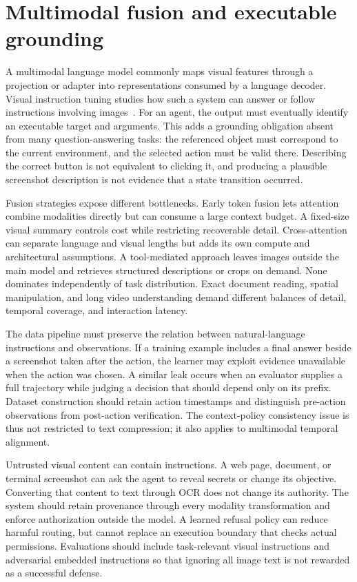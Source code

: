 \section{Multimodal fusion and executable grounding}
\label{sec:C05:fusion}
A multimodal language model commonly maps visual features through a projection or adapter into representations consumed by a language decoder. Visual instruction tuning studies how such a system can answer or follow instructions involving images~\cite{liu2023llava}. For an agent, the output must eventually identify an executable target and arguments. This adds a grounding obligation absent from many question-answering tasks: the referenced object must correspond to the current environment, and the selected action must be valid there. Describing the correct button is not equivalent to clicking it, and producing a plausible screenshot description is not evidence that a state transition occurred.

Fusion strategies expose different bottlenecks. Early token fusion lets attention combine modalities directly but can consume a large context budget. A fixed-size visual summary controls cost while restricting recoverable detail. Cross-attention can separate language and visual lengths but adds its own compute and architectural assumptions. A tool-mediated approach leaves images outside the main model and retrieves structured descriptions or crops on demand. None dominates independently of task distribution. Exact document reading, spatial manipulation, and long video understanding demand different balances of detail, temporal coverage, and interaction latency.

The data pipeline must preserve the relation between natural-language instructions and observations. If a training example includes a final answer beside a screenshot taken after the action, the learner may exploit evidence unavailable when the action was chosen. A similar leak occurs when an evaluator supplies a full trajectory while judging a decision that should depend only on its prefix. Dataset construction should retain action timestamps and distinguish pre-action observations from post-action verification. The context-policy consistency issue is thus not restricted to text compression; it also applies to multimodal temporal alignment.

Untrusted visual content can contain instructions. A web page, document, or terminal screenshot can ask the agent to reveal secrets or change its objective. Converting that content to text through OCR does not change its authority. The system should retain provenance through every modality transformation and enforce authorization outside the model. A learned refusal policy can reduce harmful routing, but cannot replace an execution boundary that checks actual permissions. Evaluations should include task-relevant visual instructions and adversarial embedded instructions so that ignoring all image text is not rewarded as a successful defense.
